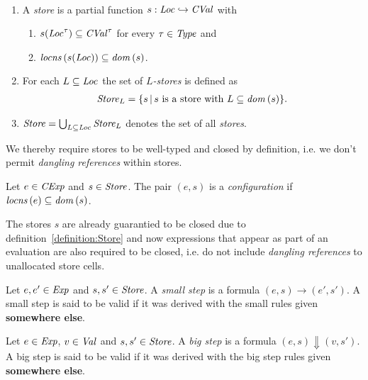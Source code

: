 \documentclass[12pt,a4paper]{report}
\newcommand{\CExp}{\nstyle{CExp}}
\newcommand{\CVal}{\nstyle{CVal}}
\begin{document}
\begin{definition}[Store] \label{definition:Store} \
  \begin{enumerate}
    \item A {\em store} is a partial function $s:\Loc \pto \CVal$ with
          \begin{enumerate}
            \item $s(\Loc^\tau) \subseteq \CVal^\tau$ for every $\tau\in\mathit{Type}$ and
            \item $\mathit{locns}\,(s(\mathit{Loc})) \subseteq \mathit{dom}\,(s)$.
          \end{enumerate}

    \item For each $L\subseteq \mathit{Loc}$ the set of {\em $L$-stores} is defined as
          \[\begin{array}{l}
            \mathit{Store}_L = \{s\,|\,\text{$s$ is a store with $L\subseteq\mathit{dom}\,(s)$}\}.
          \end{array}\]

    \item $\mathit{Store} = \bigcup_{L\subseteq\mathit{Loc}} \mathit{Store}_L$ denotes the set of all {\em stores}.
  \end{enumerate}
\end{definition}

We thereby require stores to be well-typed and closed by definition, i.e. we don't permit {\em dangling
references} within stores.

\begin{definition}[Configuration]
  Let $e\in\CExp$ and $s\in\mathit{Store}$. The pair $(e,s)$ is a {\em configuration}
  if $\mathit{locns}\,(e) \subseteq \mathit{dom}\,(s)$.
\end{definition}

The stores $s$ are already guarantied to be closed due to definition~\ref{definition:Store} and
now expressions that appear as part of an evaluation are also required to be closed, i.e. do not
include {\em dangling references} to unallocated store cells.

\begin{definition}
  Let $e,e'\in\mathit{Exp}$ and $s,s'\in\mathit{Store}$. A {\em small step} is a formula
  $(e,s) \to (e',s')$. A small step is said to be valid if it was derived with
  the small rules given {\bf somewhere else}.
\end{definition}

\begin{definition}
  Let $e\in\mathit{Exp}$, $v\in\mathit{Val}$ and $s,s'\in\mathit{Store}$. A {\em big step} is a formula
  $(e,s) \Downarrow (v,s')$. A big step is said to be valid if it was derived with the
  big step rules given {\bf somewhere else}.
\end{definition}
\end{document}
